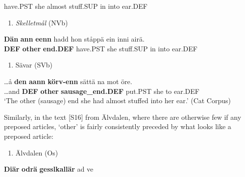 have.PST  she  almost  stuff.SUP  in  into  ear.DEF\\ %


\begin{enumerate} %
\item 
\textit{Skelletmål} (NVb)
\end{enumerate} %
\ea\label{}
\gll \textbf{Dän}\textbf{  ann}\textbf{  eenn} hadd  hon  ståppä  ein  inni  airä.\\


\textbf{DEF} \textbf{other} \textbf{end.DEF} have.PST  she  stuff.SUP  in  into  ear.DEF\\ %


\begin{enumerate} %
\item 
Sävar (SVb)

\end{enumerate} %
\ea\label{}
\gll …å  \textbf{den}\textbf{  aann}\textbf{  körv-enn} sättä  na  mot  öre.\\


…and  \textbf{DEF} \textbf{other} \textbf{sausage\_end.DEF} put.PST  she  to  ear.DEF\\ %


‘The other (sausage) end she had almost stuffed into her ear.’ (Cat Corpus)
\z


Similarly, in the text [S16] from Älvdalen, where there are otherwise few if any preposed articles,  ‘other’ is fairly consistently preceded by what looks like a preposed article:

\begin{enumerate} %
\item 
Älvdalen (Os)

\end{enumerate} %
\ea\label{}
\gll \textbf{Diär} \textbf{odrä} \textbf{gesslkallär} ad  ve\\


